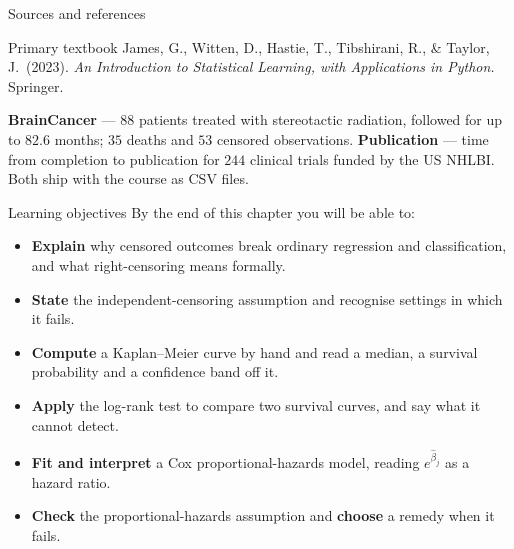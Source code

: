 \documentclass[aspectratio=169,11pt]{beamer}
\begin{document}
\begin{frame}{Sources and references}
  \begin{block}{Primary textbook}
    James, G., Witten, D., Hastie, T., Tibshirani, R., \& Taylor, J.\ (2023).
    \emph{An Introduction to Statistical Learning, with Applications in
    Python.} Springer.
  \end{block}
  \begin{readme}
    \textbf{BrainCancer} --- $88$ patients treated with stereotactic radiation, followed for up
    to $82.6$ months; $35$ deaths and $53$ censored observations. \textbf{Publication} ---
    time from completion to publication for $244$ clinical trials funded by the US NHLBI.
    Both ship with the course as CSV files.
  \end{readme}
\end{frame}

\begin{frame}{Learning objectives}
  By the end of this chapter you will be able to:
  \begin{itemize}
    \item \textbf{Explain} why censored outcomes break ordinary regression and
          classification, and what right-censoring means formally.
    \item \textbf{State} the independent-censoring assumption and recognise
          settings in which it fails.
    \item \textbf{Compute} a Kaplan--Meier curve by hand and read a median,
          a survival probability and a confidence band off it.
    \item \textbf{Apply} the log-rank test to compare two survival curves, and
          say what it cannot detect.
    \item \textbf{Fit and interpret} a Cox proportional-hazards model, reading
          $e^{\hat\beta_j}$ as a hazard ratio.
    \item \textbf{Check} the proportional-hazards assumption and \textbf{choose}
          a remedy when it fails.
  \end{itemize}
\end{frame}
\end{document}
